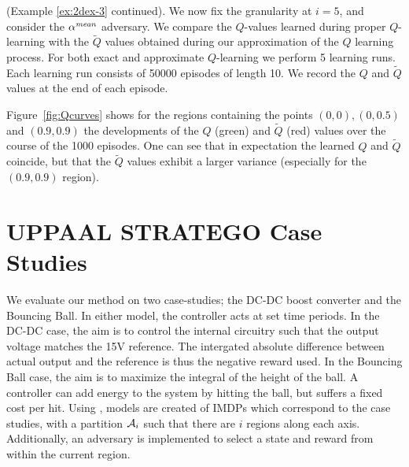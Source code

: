\documentclass{llncs}
\begin{document}
\begin{example}
\label{ex:2dex-4}
(Example \ref{ex:2dex-3} continued). We now fix the granularity at $i=5$, and 
consider the $\alpha^{\emph{mean}}$ adversary.  We compare the $Q$-values learned during proper $Q$-learning with
the $\tilde{Q}$ values obtained during our approximation of the $Q$ learning process. 
For both exact and approximate $Q$-learning we perform 5 learning
runs. Each learning run consists of 50000 episodes of length 10.
We record the $Q$ and $\tilde{Q}$ values
at the end of each episode. 

Figure~\ref{fig:Qcurves} shows for the regions containing the points $(0,0), (0,0.5)$ and $(0.9,0.9)$
the developments of the
$Q$ (green) and $\tilde{Q}$ (red) values over the course of the 1000 episodes. One can see that in expectation
the learned $Q$ and $\tilde{Q}$ coincide, but that the  $\tilde{Q}$ values exhibit a larger variance (especially
for the $(0.9,0.9)$ region). 
\end{example}



\section{U{\small{PPAAL}} S{\small{TRATEGO}} Case Studies}
We evaluate our method on two case-studies; the DC-DC boost converter\cite{dcdcconverter}
and the Bouncing Ball\cite{playball}.
In either model, the controller acts at set time periods.
In the DC-DC case, the aim is to control the internal circuitry such that the output voltage matches the 15V reference.
The intergated absolute difference between actual output and the reference is thus the negative reward used.
%
In the Bouncing Ball case, the aim is to maximize the integral of the height of the ball.
A controller can add energy to the system by hitting the ball, but suffers a fixed cost per hit.
Using \uppaalstratego, models are created of IMDPs which correspond to the case studies, 
with a partition $\mathcal{A}_i$ such that there are $i$ regions along each axis. 
Additionally, an  adversary is implemented to select a state and reward from within the current region.
\end{document}
